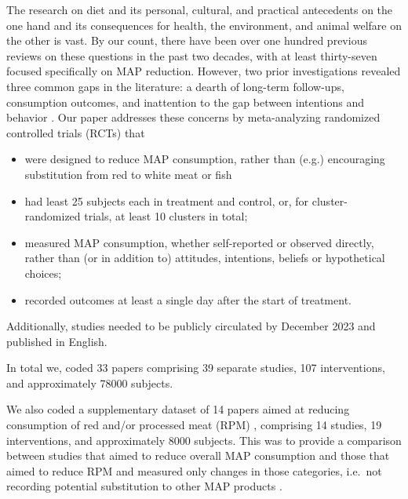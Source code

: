 \documentclass[sn-nature,pdflatex]{sn-jnl}
\begin{document}
The research on diet and its personal, cultural, and practical
antecedents on the one hand and its consequences for health, the
environment, and animal welfare on the other is vast. By our count,
there have been over one hundred previous reviews on these questions in
the past two decades, with at least thirty-seven focused specifically on
MAP reduction. However, two prior investigations revealed three common
gaps in the literature: a dearth of long-term follow-ups, consumption
outcomes, and inattention to the gap between intentions and behavior
\citep{mathur2021meta, mathur2021effectiveness}. Our paper addresses
these concerns by meta-analyzing randomized controlled trials (RCTs)
that

\begin{itemize}
\item
  were designed to reduce MAP consumption, rather than (e.g.)
  encouraging substitution from red to white meat or fish
\item
  had least 25 subjects each in treatment and control, or, for
  cluster-randomized trials, at least 10 clusters in total;
\item
  measured MAP consumption, whether self-reported or observed directly,
  rather than (or in addition to) attitudes, intentions, beliefs or
  hypothetical choices;
\item
  recorded outcomes at least a single day after the start of treatment.
\end{itemize}

Additionally, studies needed to be publicly circulated by December 2023
and published in English.

In total we, coded 33 papers
\citep{abrahamse2007, alblas2023, aldoh2023, allen2002, andersson2021, acharya2004, berndsen2005, bertolaso2015, bianchi2022, bochmann2017, bschaden2020, carfora2023, coker2022, cooney2016, fehrenbach2015, feltz2022, griesoph2021, haile2021, hatami2018, hennessy2016, jalil2023, lacroix2020, mathur2021effectiveness, mattson2020, merrill2009, norris2014, peacock2017, piester2020, polanco2022, sparkman2017, sparkman2020, sparkman2021, weingarten2022}
comprising 39 separate studies, 107 interventions, and approximately
78000 subjects.

We also coded a supplementary dataset of 14 papers aimed at reducing
consumption of red and/or processed meat (RPM)
\citep{carfora2017correlational, carfora2017randomised, carfora2019, carfora2019informational, delichatsios2001, dijkstra2022, emmons2005cancer, emmons2005project, jaacks2014, james2015, lee2018, perino2022, schatzkin2000, sorensen2005},
comprising 14 studies, 19 interventions, and approximately 8000
subjects. This was to provide a comparison between studies that aimed to
reduce overall MAP consumption and those that aimed to reduce RPM and
measured only changes in those categories, i.e.~not recording potential
substitution to other MAP products \citep{mathur2022ethical}.
\end{document}
